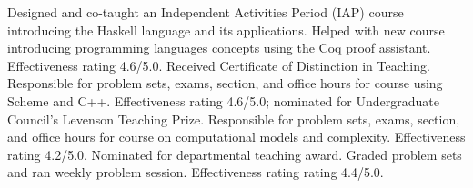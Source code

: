   {}{Designed and co-taught an Independent Activities Period (IAP) course introducing the Haskell language and its applications.}
  {}{Helped with new course introducing programming languages concepts using the Coq proof assistant.  Effectiveness rating 4.6/5.0.  Received Certificate of Distinction in Teaching.}
  {Responsible for problem sets, exams, section, and office hours for course using Scheme and C++.  Effectiveness rating 4.6/5.0; nominated for Undergraduate Council's Levenson Teaching Prize.}
  {Responsible for problem sets, exams, section, and office hours for course on computational models and complexity.  Effectiveness rating 4.2/5.0.  Nominated for departmental teaching award.}
  {Graded problem sets and ran weekly problem session.  Effectiveness rating rating 4.4/5.0.}
